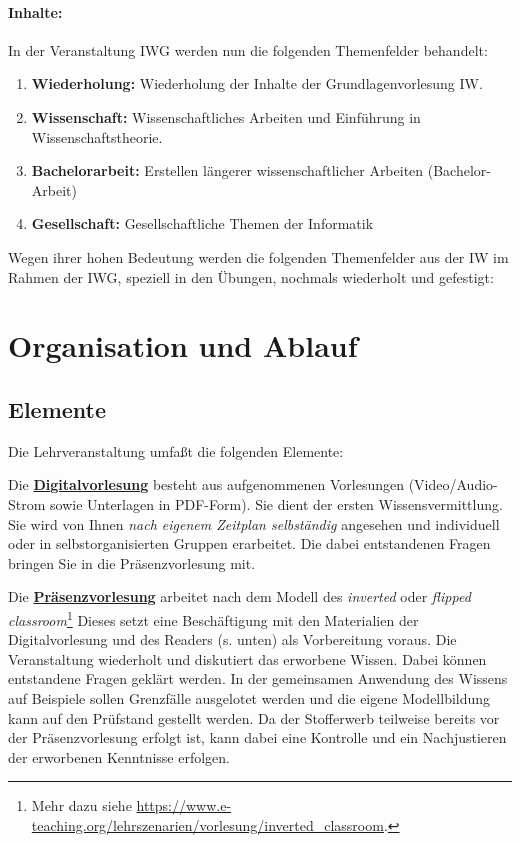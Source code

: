 \documentclass[a4paper]{article}%
\begin{document}
\bigskip


\paragraph{Inhalte:} In der Veranstaltung IWG werden nun die folgenden Themenfelder behandelt:
\begin{enumerate}
\item \textbf{Wiederholung:} \hfill Wiederholung der Inhalte der Grundlagenvorlesung IW.
\item \textbf{Wissenschaft:} \hfill Wissenschaftliches Arbeiten und Einführung in Wissenschaftstheorie.
\item \textbf{Bachelorarbeit:} \hfill Erstellen längerer wissenschaftlicher Arbeiten (Bachelor-Arbeit)
\item \textbf{Gesellschaft:}  \hfill Gesellschaftliche Themen der Informatik
\end{enumerate}


Wegen ihrer hohen Bedeutung werden die folgenden Themenfelder aus der IW im Rahmen 
der IWG, speziell in den Übungen, nochmals wiederholt und gefestigt:









\clearpage


\clearpage
\section{Organisation und Ablauf}\label{OrganisationUndAblauf}

\subsection{Elemente}

Die Lehrveranstaltung umfaßt die folgenden Elemente:

Die \hyperref[Digitalvorlesung]{\textbf{Digitalvorlesung}} besteht aus aufgenommenen Vorlesungen (Video/Audio-Strom sowie
Unterlagen in PDF-Form). Sie dient der ersten Wissensvermittlung.
Sie wird von Ihnen \textit{nach eigenem Zeitplan selb\-ständig} angesehen und individuell oder in selbstorganisierten Gruppen erarbeitet.
Die dabei entstandenen Fragen bringen Sie in die Präsenzvorlesung mit.

Die \hyperref[Prsenzvorlesung]{\textbf{Präsenzvorlesung}} arbeitet nach dem Modell des \textit{inverted} oder 
\textit{flipped classroom}\footnote{Mehr dazu siehe \url{https://www.e-teaching.org/lehrszenarien/vorlesung/inverted_classroom}.}
Dieses setzt eine Beschäftigung mit den Materialien
der Digitalvorlesung und des Readers (s. unten)
als Vorbereitung  voraus. 
Die Veranstaltung wiederholt und diskutiert das erworbene Wissen.
Dabei können entstandene Fragen geklärt werden.
In der gemeinsamen Anwendung des Wissens auf Beispiele
sollen Grenzfälle ausgelotet werden und die eigene Modellbildung kann auf
den Prüfstand gestellt werden.
Da der Stofferwerb teilweise bereits vor der Präsenzvorlesung erfolgt ist, kann dabei eine
Kontrolle und ein Nachjustieren der erworbenen Kenntnisse erfolgen.
\end{document}
